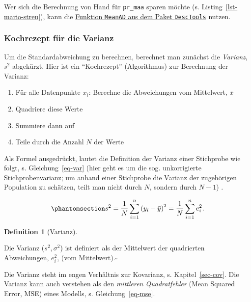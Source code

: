 \documentclass[
  a4paper,
]{scrbook}
\providecommand{\tightlist}{%
  \setlength{\itemsep}{0pt}\setlength{\parskip}{0pt}}\usepackage{longtable,booktabs,array}
\theoremstyle{definition}
\theoremstyle{definition}
\newtheorem{definition}{Definition}[chapter]
\theoremstyle{definition}
\theoremstyle{remark}
\begin{document}
Wer sich die Berechnung von Hand für \texttt{pr\_maa} sparen möchte (s.
Listing~\ref{lst-mario-streu}), kann die
\href{https://rdrr.io/cran/DescTools/man/MeanAD.html}{Funktion
\texttt{MeanAD} aus dem Paket \texttt{DescTools}} nutzen.

\subsubsection{Kochrezept für die
Varianz}\label{kochrezept-fuxfcr-die-varianz}

Um die Standardabweichung zu berechnen, berechnet man zunächst die
\emph{Varianz}, \(s^2\) abgekürzt. Hier ist ein ``Kochrezept''
(Algorithmus) zur Berechnung der Varianz:

\begin{enumerate}
\def\labelenumi{\arabic{enumi}.}
\tightlist
\item
  Für alle Datenpunkte \(x_i\): Berechne die Abweichungen vom
  Mittelwert, \(\bar{x}\)
\item
  Quadriere diese Werte
\item
  Summiere dann auf
\item
  Teile durch die Anzahl \(N\) der Werte
\end{enumerate}

Als Formel ausgedrückt, lautet die Definition der Varianz einer
Stichprobe wie folgt, s. Gleichung~\ref{eq-var} (hier geht es um die
sog. unkorrigierte Stichprobenvarianz; um anhand einer Stichprobe die
Varianz der zugehörigen Population zu schätzen, teilt man nicht durch
\(N\), sondern durch \(N-1\)) .

\begin{equation}\phantomsection\label{eq-var}{{\displaystyle s^{2}={\frac {1}{N}}\sum _{i=1}^{n}\left(y_{i}-{\bar {y}}\right)^{2}={\frac {1}{N}}\sum _{i=1}^{n}e_i^{2}.}}\end{equation}

\begin{definition}[Varianz]\protect\hypertarget{def-var}{}\label{def-var}

Die Varianz (\(s^2, \sigma^2\)) ist definiert als der Mittelwert der
quadrierten Abweichungen, \(e_i^2\), (vom Mittelwert).\(\square\)

\end{definition}

Die Varianz steht im engen Verhältnis zur Kovarianz, s.
Kapitel~\ref{sec-cov}. Die Varianz kann auch verstehen als den
\emph{mittleren Quadratfehler} (Mean Squared Error, MSE) eines Modells,
s. Gleichung~\ref{eq-mse}.
\end{document}
